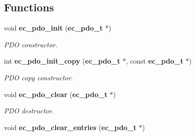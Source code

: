 \subsection*{Functions}
\begin{DoxyCompactItemize}
\item 
void {\bf ec\-\_\-pdo\-\_\-init} ({\bf ec\-\_\-pdo\-\_\-t} $\ast$)\label{pdo_8h_afa7a6b78374dc77781dbf9bae1b3dbca}

\begin{DoxyCompactList}\small\item\em P\-D\-O constructor. \end{DoxyCompactList}\item 
int {\bf ec\-\_\-pdo\-\_\-init\-\_\-copy} ({\bf ec\-\_\-pdo\-\_\-t} $\ast$, const {\bf ec\-\_\-pdo\-\_\-t} $\ast$)
\begin{DoxyCompactList}\small\item\em P\-D\-O copy constructor. \end{DoxyCompactList}\item 
void {\bf ec\-\_\-pdo\-\_\-clear} ({\bf ec\-\_\-pdo\-\_\-t} $\ast$)\label{pdo_8h_a51588a6c044259c2db97a2be97eabfd9}

\begin{DoxyCompactList}\small\item\em P\-D\-O destructor. \end{DoxyCompactList}\item 
void {\bf ec\-\_\-pdo\-\_\-clear\-\_\-entries} ({\bf ec\-\_\-pdo\-\_\-t} $\ast$)\label{pdo_8h_a9264d3cb9d741ea6b72f5a3e9be382e4}


\end{DoxyCompactItemize}
